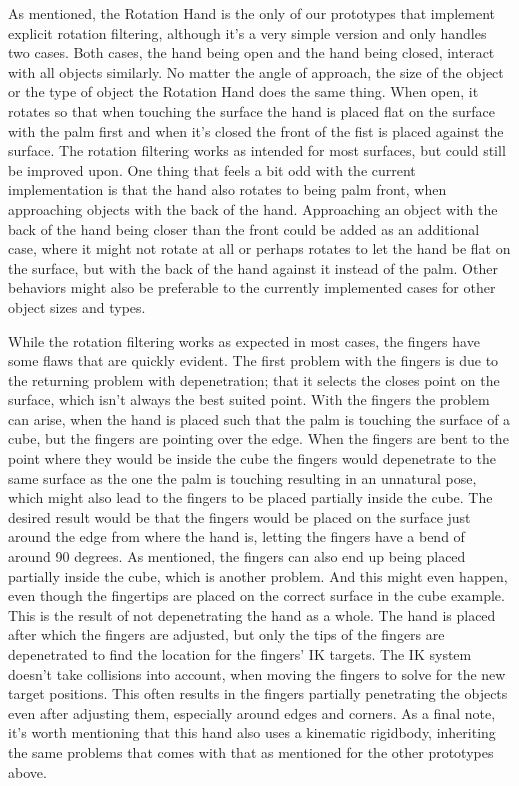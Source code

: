 As mentioned, the Rotation Hand is the only of our prototypes that implement explicit rotation filtering, although it's a very simple version and only handles two cases. Both cases, the hand being open and the hand being closed, interact with all objects similarly. No matter the angle of approach, the size of the object or the type of object the Rotation Hand does the same thing. When open, it rotates so that when touching the surface the hand is placed flat on the surface with the palm first and when it's closed the front of the fist is placed against the surface. The rotation filtering works as intended for most surfaces, but could still be improved upon. One thing that feels a bit odd with the current implementation is that the hand also rotates to being palm front, when approaching objects with the back of the hand. Approaching an object with the back of the hand being closer than the front could be added as an additional case, where it might not rotate at all or perhaps rotates to let the hand be flat on the surface, but with the back of the hand against it instead of the palm. Other behaviors might also be preferable to the currently implemented cases for other object sizes and types.

While the rotation filtering works as expected in most cases, the fingers have some flaws that are quickly evident. The first problem with the fingers is due to the returning problem with depenetration; that it selects the closes point on the surface, which isn't always the best suited point. With the fingers the problem can arise, when the hand is placed such that the palm is touching the surface of a cube, but the fingers are pointing over the edge. When the fingers are bent to the point where they would be inside the cube the fingers would depenetrate to the same surface as the one the palm is touching resulting in an unnatural pose, which might also lead to the fingers to be placed partially inside the cube. The desired result would be that the fingers would be placed on the surface just around the edge from where the hand is, letting the fingers have a bend of around 90 degrees. As mentioned, the fingers can also end up being placed partially inside the cube, which is another problem. And this might even happen, even though the fingertips are placed on the correct surface in the cube example. This is the result of not depenetrating the hand as a whole. The hand is placed after which the fingers are adjusted, but only the tips of the fingers are depenetrated to find the location for the fingers' IK targets. The IK system doesn't take collisions into account, when moving the fingers to solve for the new target positions. This often results in the fingers partially penetrating the objects even after adjusting them, especially around edges and corners. As a final note, it's worth mentioning that this hand also uses a kinematic rigidbody, inheriting the same problems that comes with that as mentioned for the other prototypes above.


